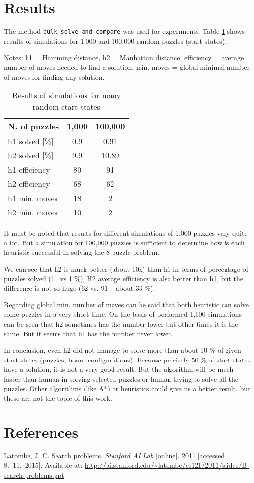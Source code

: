 \documentclass[a4paper]{article}
\begin{document}
\section{Results}

The method \verb|bulk_solve_and_compare| was used for experiments. Table \ref{table:simres} shows results of simulations for 1,000 and 100,000 random puzzles (start states). 

Notes: h1 = Hamming distance, h2 = Manhattan distance, efficiency = average number of moves needed to find a solution, min. moves = global minimal number of moves for finding any solution.

\renewcommand{\arraystretch}{1.5}
\begin{table}[h!]
\centering
\caption{Results of simulations for many random start states}
\label{table:simres}
\begin{tabular}{ | l | c| c|}
\hline
N. of puzzles & 1,000 & 100,000 \\ 
\hline
h1 solved [\%] & 0.9 & 0.91 \\
h2 solved [\%] & 9.9 & 10.89 \\
h1 efficiency & 80 & 91 \\
h2 efficiency & 68 & 62 \\
h1 min. moves & 18 & 2 \\
h2 min. moves & 10 & 2 \\
\hline
\end{tabular}
\end{table}

It must be noted that results for different simulations of 1,000 puzzles vary quite a lot. But a simulation for 100,000 puzzles is sufficient to determine how is each heuristic successful in solving the 8-puzzle problem. 

We can see that h2 is much better (about 10x) than h1 in terms of percentage of puzzles solved (11 vs 1 \%). H2 average efficiency is also better than h1, but the difference is not so huge (62 vs. 91 -- about 33 \%). 

Regarding global min. number of moves can be said that both heuristic can solve some puzzles in a very short time. On the basis of performed 1,000 simulations can be seen that h2 sometimes has the number lower but other times it is the same. But it seems that h1 has the number never lower.

In conclusion, even h2 did not manage to solve more than about 10 \% of given start states (puzzles, board configurations). Because precisely 50 \% of start states have a solution, it is not a very good result. But the algorithm will be much faster than human in solving selected puzzles or human trying to solve all the puzzles. Other algorithms (like A*) or heuristics could give us a better result, but these are not the topic of this work.

\section{References}

Latombe, J. C. Search problems. \textit{Stanford AI Lab} [online]. 2011 [accessed 8.~11.~2015]. Available at: \url{http://ai.stanford.edu/~latombe/cs121/2011/slides/B-search-problems.ppt}
\end{document}
